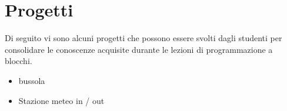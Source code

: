 \documentclass[../../docenti.tex]{subfiles}
\begin{document}
\section{Progetti}
Di seguito vi sono alcuni progetti che possono essere svolti dagli studenti per consolidare le conoscenze acquisite durante le lezioni di programmazione a blocchi.

\begin{itemize}
	\item bussola
	\item Stazione meteo in / out
\end{itemize}
\end{document}
